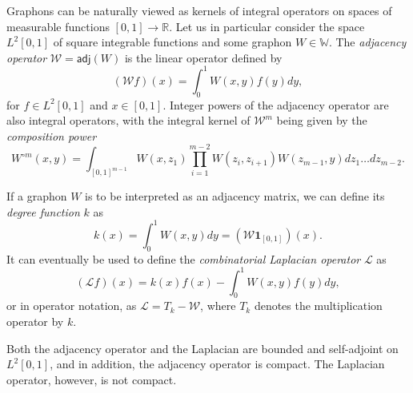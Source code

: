 \documentclass[11pt]{article}
\def\R{\mathbb{R}}
\def\WW{\mathbb{W}}
\def\II{\bm{1}}
\def\calW{\mathcal{W}}
\def\calL{\mathcal{L}}
\newcommand{\sans}[1]{\mathsf{#1}}
\def\adj{\sans{adj}}
\theoremstyle{definition}
\begin{document}
Graphons can be naturally viewed as kernels of integral operators on spaces of measurable functions $[0,1] \rightarrow \R$. Let us in particular consider the space $L^2 [0,1]$ of square integrable functions and some graphon $W \in \WW$. The \textit{adjacency operator} $\calW = \adj (W)$ is the linear operator defined by
$$ (\calW f)(x) = \int_0^1 W(x,y) f(y) dy, $$
for $f \in L^2 [0,1]$ and $x \in [0,1]$. Integer powers of the adjacency operator are also integral operators, with the integral kernel of $\calW^m$ being given by the \textit{composition power}
$$ W^{\circ m} (x,y) = \int_{[0,1]^{m-1}} W(x,z_1) \prod_{i=1}^{m-2} W(z_i,z_{i+1}) W(z_{m-1},y) dz_1 \dots dz_{m-2}. $$

If a graphon $W$ is to be interpreted as an adjacency matrix, we can define its \textit{degree function} $k$ as 
$$ k(x) = \int_0^1 W(x,y) dy = (\calW \II_{[0,1]})(x). $$
It can eventually be used to define the \textit{combinatorial Laplacian operator} $\calL$ as
$$ (\calL f)(x) = k(x) f(x) - \int_0^1 W(x,y) f(y) dy, $$
or in operator notation, as $\calL = T_k - \calW$, where $T_k$ denotes the multiplication operator by $k$.

Both the adjacency operator and the Laplacian are bounded and self-adjoint on $L^2 [0,1]$, and in addition, the adjacency operator is compact. The Laplacian operator, however, is not compact.
\end{document}
